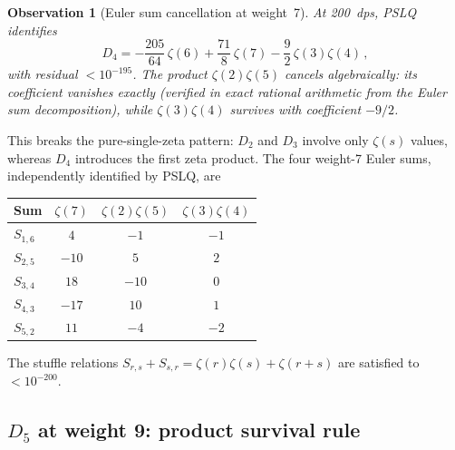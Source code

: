 \documentclass[11pt]{article}
\newtheorem{observation}{Observation}
\begin{document}
\begin{observation}[Euler sum cancellation at weight~7]
\label{obs:euler_cancel}
At 200~dps, PSLQ identifies
\begin{equation}
\label{eq:D4_decomp}
  D_4 = -\frac{205}{64}\,\zeta(6)
  + \frac{71}{8}\,\zeta(7)
  - \frac{9}{2}\,\zeta(3)\zeta(4)\,,
\end{equation}
with residual $< 10^{-195}$.  The product $\zeta(2)\zeta(5)$ cancels
\emph{algebraically}: its coefficient vanishes exactly (verified in
exact rational arithmetic from the Euler sum decomposition), while
$\zeta(3)\zeta(4)$ survives with coefficient $-9/2$.
\end{observation}

This breaks the pure-single-zeta pattern: $D_2$ and $D_3$ involve
only $\zeta(s)$ values, whereas $D_4$ introduces the first zeta
product.  The four weight-7 Euler sums, independently identified by
PSLQ, are
\begin{center}
\begin{tabular}{lccc}
\hline
Sum & $\zeta(7)$ & $\zeta(2)\zeta(5)$ & $\zeta(3)\zeta(4)$ \\
\hline
$S_{1,6}$ & $4$ & $-1$ & $-1$ \\
$S_{2,5}$ & $-10$ & $5$ & $2$ \\
$S_{3,4}$ & $18$ & $-10$ & $0$ \\
$S_{4,3}$ & $-17$ & $10$ & $1$ \\
$S_{5,2}$ & $11$ & $-4$ & $-2$ \\
\hline
\end{tabular}
\end{center}
The stuffle relations $S_{r,s} + S_{s,r} = \zeta(r)\zeta(s) + \zeta(r+s)$
are satisfied to $< 10^{-200}$.

\subsection{$D_5$ at weight 9: product survival rule}
\end{document}
